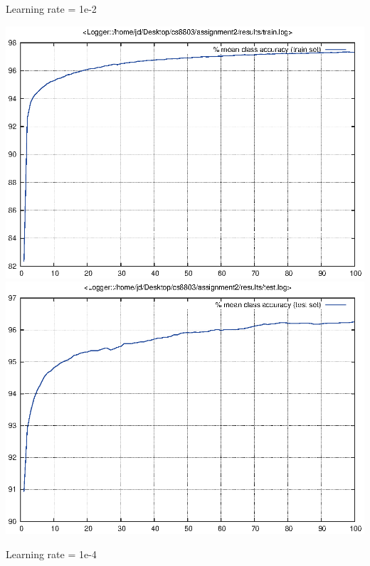 \documentclass[twoside,12pt]{article}
\newcommand{\imsize}{0.5\linewidth}
\begin{document}
Learning rate = 1e-2

\includegraphics[width=\imsize]{assignment2/results/sgd_r2_train}
\includegraphics[width=\imsize]{assignment2/results/sgd_r2_test}

Learning rate = 1e-4
\end{document}
